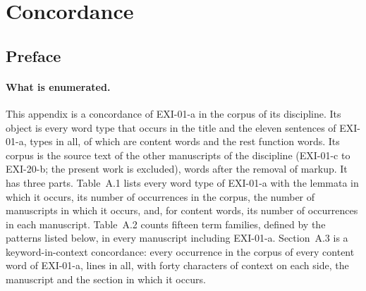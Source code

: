 \section{Concordance}\label{app:conc}

\subsection*{Preface}

\paragraph{What is enumerated.} This appendix is a concordance of EXI-01-a in the corpus of its discipline. Its object is every word type that occurs in the title and the eleven sentences of EXI-01-a, \cnTypes{} types in all, of which \cnContent{} are content words and the rest function words. Its corpus is the source text of the \cnOtherMss{} other manuscripts of the discipline (EXI-01-c to EXI-20-b; the present work is excluded), \cnCorpusWords{} words after the removal of markup. It has three parts. Table~A.1 lists every word type of EXI-01-a with the lemmata in which it occurs, its number of occurrences in the corpus, the number of manuscripts in which it occurs, and, for content words, its number of occurrences in each manuscript. Table~A.2 counts fifteen term families, defined by the patterns listed below, in every manuscript including EXI-01-a. Section~A.3 is a keyword-in-context concordance: every occurrence in the corpus of every content word of EXI-01-a, \cnKwic{} lines in all, with forty characters of context on each side, the manuscript and the section in which it occurs.

